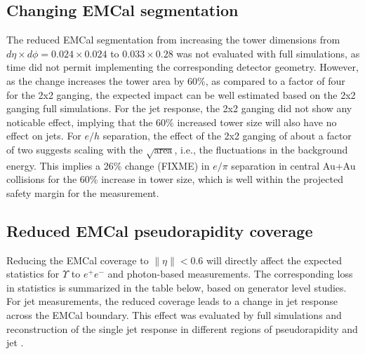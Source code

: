\subsection{Changing EMCal segmentation}
The reduced EMCal segmentation from increasing the tower dimensions
from $d\eta \times d\phi = 0.024 \times 0.024$ to $0.033 \times 0.28$
was not evaluated with full \geant simulations, as time did not permit
implementing the corresponding detector geometry. However, as the
change increases the tower area by 60\%, as compared to a factor of
four for the 2x2 ganging, the expected impact can be well estimated
based on the 2x2 ganging full simulations. For the jet response, the
2x2 ganging did not show any noticable effect, implying that the 60\%
increased tower size will also have no effect on jets. For $e/h$
separation, the effect of the 2x2 ganging of about a factor of two
suggests scaling with the $\sqrt{\mbox{area}}$, i.e., the fluctuations
in the background energy. This implies a 26\% change (FIXME) in
$e/\pi$ separation in central Au+Au collisions for the 60\% increase
in tower size, which is well within the projected safety margin for
the measurement.

\subsection{Reduced EMCal pseudorapidity coverage}
Reducing the EMCal coverage to $\| \eta \| < 0.6$ will directly affect
the expected statistics for $\Upsilon$ to $e^+ e^-$ and photon-based
measurements. The corresponding loss in statistics is summarized in
the table below, based on generator level studies. For jet
measurements, the reduced coverage leads to a change in jet response
across the EMCal boundary. This effect was evaluated by full \geant
simulations and reconstruction of the single jet response in different
regions of pseudorapidity and jet \pt.

